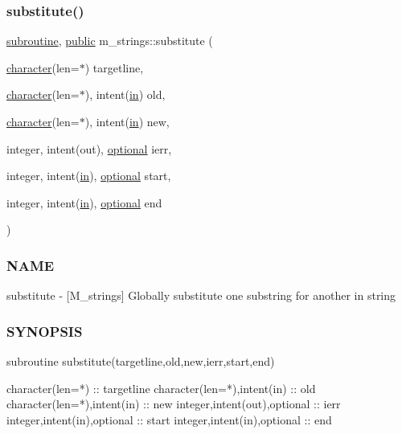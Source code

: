 \subsubsection{\texorpdfstring{substitute()}{substitute()}}
{\footnotesize\ttfamily \hyperlink{M__stopwatch_83_8txt_acfbcff50169d691ff02d4a123ed70482}{subroutine}, \hyperlink{M__stopwatch_83_8txt_a2f74811300c361e53b430611a7d1769f}{public} m\+\_\+strings\+::substitute (\begin{DoxyParamCaption}\item[{\hyperlink{option__stopwatch_83_8txt_abd4b21fbbd175834027b5224bfe97e66}{character}(len=$\ast$)}]{targetline,  }\item[{\hyperlink{option__stopwatch_83_8txt_abd4b21fbbd175834027b5224bfe97e66}{character}(len=$\ast$), intent(\hyperlink{M__journal_83_8txt_afce72651d1eed785a2132bee863b2f38}{in})}]{old,  }\item[{\hyperlink{option__stopwatch_83_8txt_abd4b21fbbd175834027b5224bfe97e66}{character}(len=$\ast$), intent(\hyperlink{M__journal_83_8txt_afce72651d1eed785a2132bee863b2f38}{in})}]{new,  }\item[{integer, intent(out), \hyperlink{option__stopwatch_83_8txt_aa4ece75e7acf58a4843f70fe18c3ade5}{optional}}]{ierr,  }\item[{integer, intent(\hyperlink{M__journal_83_8txt_afce72651d1eed785a2132bee863b2f38}{in}), \hyperlink{option__stopwatch_83_8txt_aa4ece75e7acf58a4843f70fe18c3ade5}{optional}}]{start,  }\item[{integer, intent(\hyperlink{M__journal_83_8txt_afce72651d1eed785a2132bee863b2f38}{in}), \hyperlink{option__stopwatch_83_8txt_aa4ece75e7acf58a4843f70fe18c3ade5}{optional}}]{end }\end{DoxyParamCaption})}



\subsubsection*{N\+A\+ME}

substitute -\/ \mbox{[}M\+\_\+strings\mbox{]} Globally substitute one substring for another in string 

\subsubsection*{S\+Y\+N\+O\+P\+S\+IS}

\begin{DoxyVerb}subroutine substitute(targetline,old,new,ierr,start,end)

 character(len=*)              :: targetline
 character(len=*),intent(in)   :: old
 character(len=*),intent(in)   :: new
 integer,intent(out),optional  :: ierr
 integer,intent(in),optional   :: start
 integer,intent(in),optional   :: end
\end{DoxyVerb}


